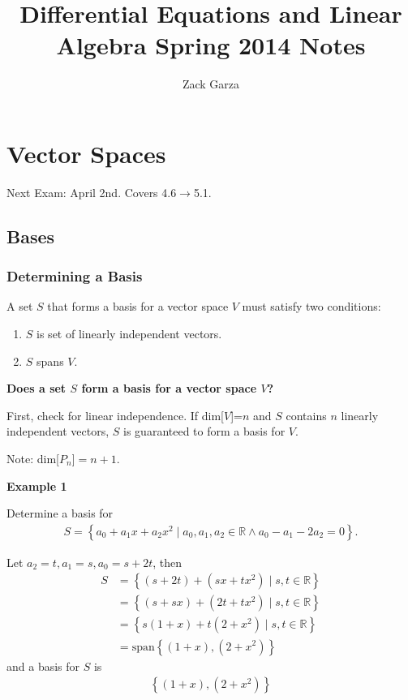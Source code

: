 \documentclass[a4paper,10pt]{report}
\begin{document}
\title{Differential Equations and Linear Algebra Spring 2014 Notes}
\author{Zack Garza}
\maketitle
\tableofcontents

\chapter{Vector Spaces}
Next Exam: April 2nd. Covers 4.6$\rightarrow$5.1.

\section{Bases}
\subsection{Determining a Basis}
A set $S$ that forms a basis for a vector space $V$ must satisfy two conditions:

\begin{enumerate}
 \item $S$ is set of linearly independent vectors.
 \item $S$ spans $V$.
\end{enumerate}

\textbf{Does a set $S$ form a basis for a vector space $V$?}

First, check for linear independence. If dim[$V$]=$n$ and $S$ contains $n$ linearly independent vectors, $S$ is guaranteed to form a basis for $V$.

Note: dim[$P_n$]$=n+1$.

\textbf{Example 1}

Determine a basis for
\begin{align*}
 S = \left\{a_0 + a_1 x + a_2 x^2\mid a_0,a_1,a_2 \in \mathbb{R} \land a_0 - a_1 -2a_2 =0\right\}.
\end{align*}

Let $a_2=t, a_1=s, a_0=s+2t$, then
\begin{align*}
 S 	&= \left\{ (s+2t) + (sx+tx^2)\mid s,t\in\mathbb{R} \right\} \\
	&= \left\{ (s+sx) + (2t+tx^2)\mid s,t\in\mathbb{R} \right\} \\
	&= \left\{ s(1+x) + t(2+x^2)\mid s,t\in\mathbb{R} \right\} \\
	&= \text{span}\left\{(1+x),(2+x^2)\right\}
\end{align*}
and a basis for $S$ is
\begin{align*}
 \left\{(1+x), (2+x^2)\right\}
\end{align*}
\end{document}
